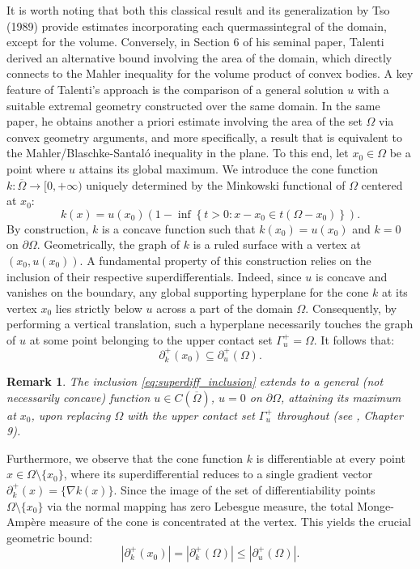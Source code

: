 \documentclass[10pt,a4paper]{amsart}
\newtheorem{remark}[theorem]{Remark}
\numberwithin{equation}{section}
\begin{document}
\vspace{1em}
\noindent It is worth noting that both this classical result and its generalization by Tso (1989) provide estimates incorporating each quermassintegral of the domain, except for the volume. Conversely, in Section 6 of his seminal paper, Talenti derived an alternative bound involving the area of the domain, which directly connects to the Mahler inequality for the volume product of convex bodies. A key feature of Talenti's approach is the comparison of a general solution $u$ with a suitable extremal geometry constructed over the same domain. In the same paper, he obtains another a priori estimate involving the area of the set $\Omega$ via convex geometry arguments, and more specifically, a result that is equivalent to the Mahler/Blaschke-Santaló inequality in the plane. To this end, let $x_0 \in \Omega$ be a point where $u$ attains its global maximum. We introduce the cone function $k: \overline{\Omega} \to [0, +\infty)$ uniquely determined by the Minkowski functional of $\Omega$ centered at $x_0$:
\begin{equation}\label{eq:cone_definition}
k(x) = u(x_0) \left( 1 - \inf\left\{ t > 0 : x - x_0 \in t(\Omega - x_0) \right\} \right).
\end{equation}
By construction, $k$ is a concave function such that $k(x_0) = u(x_0)$ and $k = 0$ on $\partial\Omega$. Geometrically, the graph of $k$ is a ruled surface with a vertex at $(x_0, u(x_0))$. A fundamental property of this construction relies on the inclusion of their respective superdifferentials. Indeed, since $u$ is concave and vanishes on the boundary, any global supporting hyperplane for the cone $k$ at its vertex $x_0$ lies strictly below $u$ across a part of the domain $\Omega$. Consequently, by performing a vertical translation, such a hyperplane necessarily touches the graph of $u$ at some point belonging to the upper contact set $\Gamma_u^+ = \Omega$. It follows that:
\begin{equation}\label{eq:superdiff_inclusion}
\partial^+_k(x_0) \subseteq \partial^+_u(\Omega).
\end{equation}
\begin{remark}\label{rem:general-u}
The inclusion \eqref{eq:superdiff_inclusion} extends to a general (not necessarily concave) function $u\in C(\overline\Omega)$, $u=0$ on $\partial\Omega$, attaining its maximum at $x_0$, upon replacing $\Omega$ with the upper contact set $\Gamma_u^+$ throughout (see \cite{gilbarg2001}, Chapter 9).
\end{remark}
\noindent Furthermore, we observe that the cone function $k$ is differentiable at every point $x \in \Omega \setminus \{x_0\}$, where its superdifferential reduces to a single gradient vector $\partial^+_k(x) = \{\nabla k(x)\}$. Since the image of the set of differentiability points $\Omega \setminus \{x_0\}$ via the normal mapping has zero Lebesgue measure, the total Monge-Ampère measure of the cone is concentrated at the vertex. This yields the crucial geometric bound:
\begin{equation}\label{eq:measure_bound_cone}
|\partial^+_k(x_0)| = |\partial^+_k(\Omega)| \leq |\partial^+_u(\Omega)|.
\end{equation}
\end{document}
